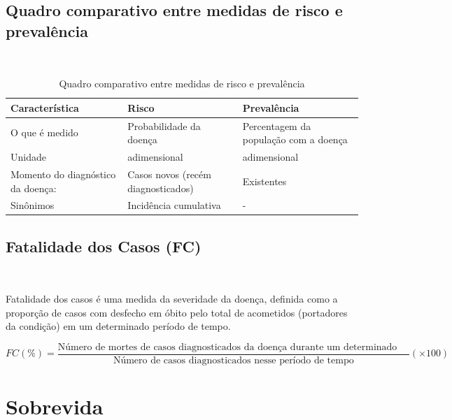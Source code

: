 \documentclass[
]{book}
\begin{document}
\hypertarget{quadro-comparativo-entre-medidas-de-risco-e-prevaluxeancia}{%
\subsection{Quadro comparativo entre medidas de risco e prevalência}\label{quadro-comparativo-entre-medidas-de-risco-e-prevaluxeancia}}

~

\begin{table}[h]
\caption{Quadro comparativo entre medidas de risco e prevalência}
\begin{tabular}{|p{3cm}|p{6cm}|p{6cm}|}
\hline
Característica &  Risco  & Prevalência  \\
\hline
O que é medido & Probabilidade da doença & Percentagem da população com a doença \\
\hline
Unidade & adimensional & adimensional \\
\hline
Momento do diagnóstico da doença: & Casos novos (recém diagnosticados) & Existentes \\
\hline
Sinônimos & Incidência cumulativa & - \\
\hline
\end{tabular}
\label{tab11}
\end{table} 

\hfill\break

\hypertarget{fatalidade-dos-casos-fc}{%
\subsection{Fatalidade dos Casos (FC)}\label{fatalidade-dos-casos-fc}}

~

Fatalidade dos casos é uma medida da severidade da doença, definida como a proporção de casos com desfecho em óbito pelo total de acometidos (portadores da condição) em um determinado período de tempo.

\hfill\break

\[
FC(\%)=\frac{\text{Número de mortes de casos diagnosticados da doença durante um determinado período de tempo}}{\text{Número de casos diagnosticados nesse período de tempo}} (\times 100)
\]

\hfill\break

\hypertarget{sobrevida}{%
\section{Sobrevida}\label{sobrevida}}
\end{document}
